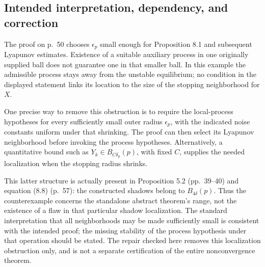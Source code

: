 \documentclass[10pt]{article}
\begin{document}
\subsection*{Intended interpretation, dependency, and correction}
The proof on p. 50 chooses \(\epsilon_p\) small enough for Proposition 8.1 and subsequent Lyapunov estimates. Existence of a suitable auxiliary process in one originally supplied ball does not guarantee one in that smaller ball. In this example the admissible process stays away from the unstable equilibrium; no condition in the displayed statement links its location to the size of the stopping neighborhood for \(X\).\par
One precise way to remove this obstruction is to require the local-process hypotheses for every sufficiently small outer radius \(\epsilon_p\), with the indicated noise constants uniform under that shrinking. The proof can then select its Lyapunov neighborhood before invoking the process hypotheses. Alternatively, a quantitative bound such as \(Y_k\in B_{C\delta_p}(p)\), with fixed \(C\), supplies the needed localization when the stopping radius shrinks.\par
This latter structure is actually present in Proposition 5.2 (pp. 39–40) and equation (8.8) (p. 57): the constructed shadows belong to \(B_{4\delta}(p)\). Thus the counterexample concerns the standalone abstract theorem’s range, not the existence of a flaw in that particular shadow localization. The standard interpretation that all neighborhoods may be made sufficiently small is consistent with the intended proof; the missing stability of the process hypothesis under that operation should be stated. The repair checked here removes this localization obstruction only, and is not a separate certification of the entire nonconvergence theorem.\par
\end{document}
